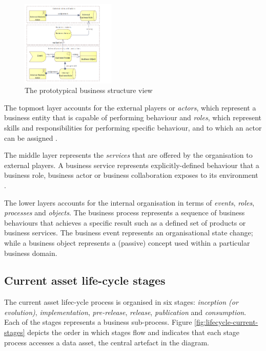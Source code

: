 	\begin{figure}[h]
		\centering
		\includegraphics[width=0.4\textwidth]{images/views/Business view.png}
		\caption{The prototypical business structure view}
		\label{fig:business-structure-protopypical}
	\end{figure} 
	
	The topmost layer accounts for the external players or \textit{actors}, which represent a business entity that is capable of performing behaviour and \textit{roles}, which represent skills and responsibilities for performing specific behaviour, and to which an actor can be assigned \citep{archimate3.1}. 
	
	The middle layer represents the \textit{services} that are offered by the organisation to external players. A business service represents explicitly-defined behaviour that a business role, business actor or business collaboration exposes to its environment \citep{archimate3.1}.
	

	
	The lower layers accounts for the internal organisation in terms of \textit{events}, \textit{roles}, \textit{processes} and \textit{objects}. The business process represents a sequence of business behaviours that achieves a specific result such as a defined set of products or business services. The business event represents an organisational state change; while a business object represents a (passive) concept used within a particular business domain.
	

	\subsection{Current asset life-cycle stages}
	\label{sec:lifecycle-current-stages}
	
	The current asset lifec-ycle process is organised in six stages: \textit{inception (or evolution)}, \textit{implementation}, \textit{pre-release}, \textit{release}, \textit{publication} and \textit{consumption}. Each of the stages represents a business sub-process. Figure \ref{fig:lifecycle-current-stages} depicts the order in which stages flow and indicates that each stage process accesses a data asset, the central artefact in the diagram.
	
